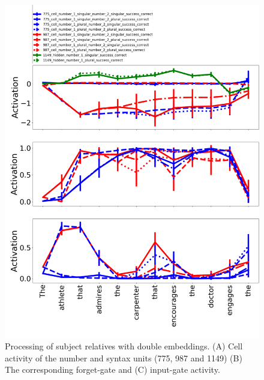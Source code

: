\begin{figure}[b]
\centering
\includegraphics[width=\linewidth]{Paper_figures/Figure8_doubleRC.png}
\caption{Processing of subject relatives with double embeddings. (A) Cell activity of the number and syntax units (775, 987 and 1149) (B) The corresponding forget-gate and (C) input-gate activity.}
\end{figure}
